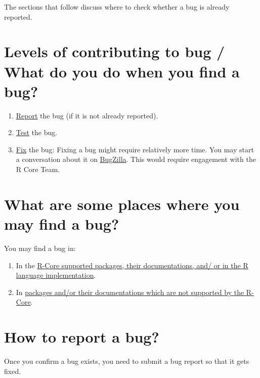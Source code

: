 \documentclass[
]{book}
\begin{document}
The sections that follow discuss where to check whether a bug is already reported.

\hypertarget{levels-of-contributing-to-bug-what-do-you-do-when-you-find-a-bug}{%
\section{Levels of contributing to bug / What do you do when you find a bug?}\label{levels-of-contributing-to-bug-what-do-you-do-when-you-find-a-bug}}

\begin{enumerate}
\def\labelenumi{\arabic{enumi}.}
\item
  \protect\hyperlink{ReportBug}{Report} the bug (if it is not already reported).
\item
  \href{}{Test} the bug.
\item
  \protect\hyperlink{FixBug}{Fix} the bug: Fixing a bug might require relatively more time. You may start a conversation about it on \href{https://bugs.r-project.org/bugzilla/index.cgi}{BugZilla}. This would require engagement with the R Core Team.
\end{enumerate}

\hypertarget{what-are-some-places-where-you-may-find-a-bug}{%
\section{What are some places where you may find a bug?}\label{what-are-some-places-where-you-may-find-a-bug}}

You may find a bug in:

\begin{enumerate}
\def\labelenumi{\arabic{enumi}.}
\item
  In the \protect\hyperlink{RCorePkgBug}{R-Core supported packages, their documentations, and/ or in the R language implementation}.
\item
  In \protect\hyperlink{nonRCorePkgBug}{packages and/or their documentations which are not supported by the R-Core}.
\end{enumerate}

\hypertarget{ReportBug}{%
\section{How to report a bug?}\label{ReportBug}}

Once you confirm a bug exists, you need to submit a bug report so that it gets fixed.
\end{document}
